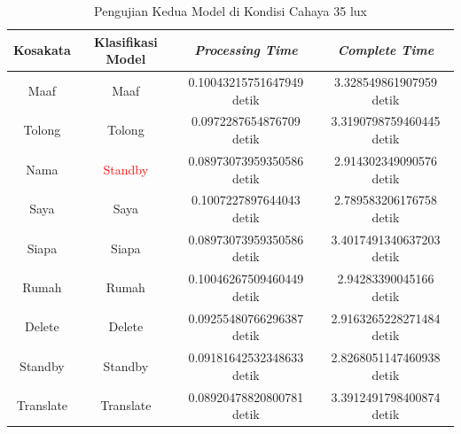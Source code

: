 \begin{longtable}{|c|c|c|c|}
  \caption{Pengujian Kedua Model di Kondisi Cahaya 35 lux}
  \label{tb:prediksigelap2}                                   \\
  \hline
  \rowcolor[HTML]{C0C0C0}
  \textbf{Kosakata} & \textbf{Klasifikasi Model} & \textbf{\emph{Processing Time}} & \textbf{\emph{Complete Time}} \\
  \hline
  Maaf              & Maaf                            & 0.10043215751647949 detik                           & 3.328549861907959 detik                                 \\
  Tolong            & Tolong                          & 0.0972287654876709 detik                            & 3.3190798759460445 detik                                  \\
  Nama              & \textcolor{red}{Standby}        & 0.08973073959350586 detik                           & 2.914302349090576 detik                                 \\
  Saya              & Saya                            & 0.1007227897644043 detik                            & 2.789583206176758 detik                                 \\
  Siapa              & Siapa                          & 0.08973073959350586 detik                           & 3.4017491340637203 detik                                  \\
  Rumah             & Rumah                           & 0.10046267509460449 detik                           & 2.94283390045166 detik                                \\
  Delete            & Delete                          & 0.09255480766296387 detik                           & 2.9163265228271484 detik                                  \\
  Standby           & Standby                         & 0.09181642532348633 detik                           & 2.8268051147460938 detik                                  \\
  Translate         & Translate                       & 0.08920478820800781 detik                           & 3.3912491798400874 detik                                  \\
  \hline
\end{longtable}

